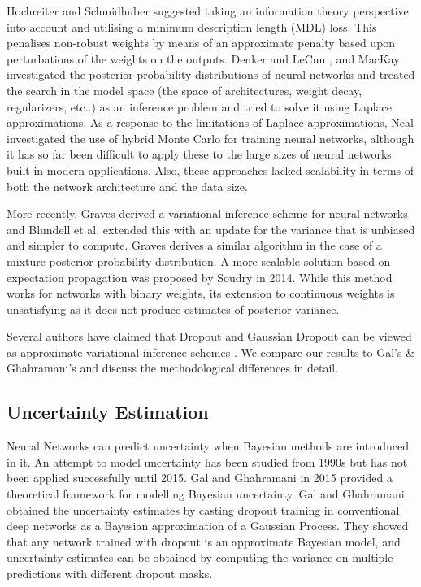 Hochreiter and Schmidhuber \cite{hochreiter1995simplifying} suggested taking an information theory perspective into account and utilising a minimum description length (MDL) loss. This penalises non-robust weights by means of an approximate penalty based upon perturbations of the weights on the outputs.
Denker and LeCun \cite{denker1991transforming}, and MacKay \cite{mackay1995probable} investigated the posterior probability distributions of neural networks and treated the search in the model space (the space of architectures, weight decay, regularizers, etc..) as an inference problem and tried to solve it using Laplace approximations.
As a response to the limitations of Laplace approximations, Neal \cite{neal2012bayesian} investigated the use of hybrid Monte Carlo for training neural networks, although it has so far been difficult to apply these to the large sizes of neural networks built in modern applications. 
Also, these approaches lacked scalability in terms of both the network architecture and the data size. 


More recently, Graves \cite{graves2011practical} derived a variational inference scheme for neural networks and Blundell et al. \cite{blundell2015weight} extended this with an update for the variance that is unbiased and simpler to compute. Graves \cite{graves2016stochastic} derives a similar algorithm in the case of a mixture posterior probability distribution. 
A more scalable solution based on expectation propagation was proposed by Soudry \cite{Soudry:NIPS2014_5269} in 2014. While this method works for networks with binary weights, its extension to continuous weights is unsatisfying as it does not produce estimates of posterior variance.

\newline Several authors have claimed that Dropout \cite{srivastava2014dropout} and Gaussian Dropout \cite{wang2013fast} can be viewed as approximate variational inference schemes \cite{gal2015bayesian, kingma2015variational}. We compare our results to Gal's \& Ghahramani's \cite{gal2015bayesian} and discuss the methodological differences in detail.


\subsection{Uncertainty Estimation}

Neural Networks can predict uncertainty when Bayesian methods are introduced in it. An attempt to model uncertainty has been studied from 1990s \cite{neal2012bayesian} but has not been applied successfully until 2015. Gal and Ghahramani \cite{Gal2015Dropout} in 2015 provided a theoretical framework for modelling Bayesian uncertainty. Gal and Ghahramani \cite{gal2015bayesian} obtained the uncertainty estimates by casting dropout training in conventional deep networks as a Bayesian approximation of a Gaussian Process. They showed that any network trained with dropout is an approximate Bayesian model, and uncertainty estimates can be obtained by computing the variance on multiple predictions with different dropout masks.

